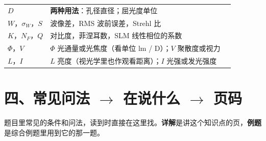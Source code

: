 {\begin{longtable}{@{}P{2.6cm}P{13.6cm}>{\raggedleft\arraybackslash}p{0.8cm}@{}}
$D$ & \textbf{两种用法}：孔径直径；屈光度单位 & \pageref{sec:lenscombo}\\
$W$，$\sigma_W$，$S$ & 波像差，RMS 波前误差，Strehl 比 & \pageref{sec:aberrms}\\
$K$，$N_F$，$Q$ & 对比度，菲涅耳数，SLM 线性相位的系数 & \pageref{sec:typeE}\\
$\Phi$，$V$ & $\Phi$ 光通量或光焦度（看单位 lm / D）；$V$ 聚散度或视力 & \pageref{sec:photounits}\\
$L$，$I$ & $L$ 亮度（视光学里也作观看距离）；$I$ 光强或发光强度 & \pageref{sec:photounits}\\
\end{longtable}}

\clearpage
\section*{四、常见问法 $\to$ 在说什么 $\to$ 页码}\label{tab:phrases}
\noindent 题目里常见的条件和问法，读到时直接在这里找。\textbf{详解}是讲这个知识点的页，\textbf{例题}是综合例题里用到它的那一题。

